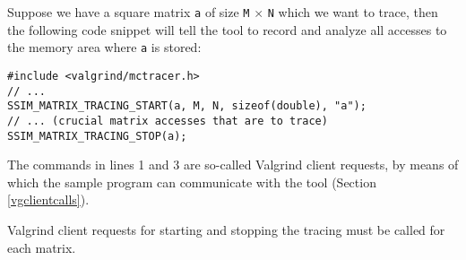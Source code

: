 Suppose we have a square matrix \texttt{a} of size \texttt{M} $\times$ \texttt{N} which we want to trace, then the following code snippet will tell the tool to record and analyze all accesses to the memory area where \texttt{a} is stored:
\begin{lstlisting}
#include <valgrind/mctracer.h>
// ...
SSIM_MATRIX_TRACING_START(a, M, N, sizeof(double), "a");
// ... (crucial matrix accesses that are to trace)
SSIM_MATRIX_TRACING_STOP(a);
\end{lstlisting}
The commands in lines 1 and 3 are so-called Valgrind client requests, by means of which the sample program can communicate with the tool (Section \ref{vgclientcalls}).
%

Valgrind client requests for starting and stopping the tracing must be called for each matrix.

